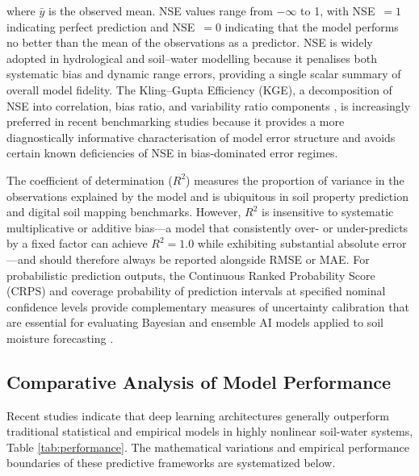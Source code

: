 \documentclass[land,article,submit,pdftex,moreauthors]{Definitions/mdpi}
\numberwithin{equation}{section}
\begin{document}
where $\bar{y}$ is the observed mean. NSE values range from $-\infty$ to 1, with NSE~$= 1$ indicating perfect prediction and NSE~$= 0$ indicating that the model performs no better than the mean of the observations as a predictor. NSE is widely adopted in hydrological and soil--water modelling because it penalises both systematic bias and dynamic range errors, providing a single scalar summary of overall model fidelity. The Kling--Gupta Efficiency (KGE), a decomposition of NSE into correlation, bias ratio, and variability ratio components \citep{gupta2009decomposition}, is increasingly preferred in recent benchmarking studies because it provides a more diagnostically informative characterisation of model error structure and avoids certain known deficiencies of NSE in bias-dominated error regimes.

The coefficient of determination ($R^2$) measures the proportion of variance in the observations explained by the model and is ubiquitous in soil property prediction and digital soil mapping benchmarks. However, $R^2$ is insensitive to systematic multiplicative or additive bias---a model that consistently over- or under-predicts by a fixed factor can achieve $R^2 = 1.0$ while exhibiting substantial absolute error---and should therefore always be reported alongside RMSE or MAE. For probabilistic prediction outputs, the Continuous Ranked Probability Score (CRPS) and coverage probability of prediction intervals at specified nominal confidence levels provide complementary measures of uncertainty calibration that are essential for evaluating Bayesian and ensemble AI models applied to soil moisture forecasting \citep{gneiting2007strictly}.

\subsection{Comparative Analysis of Model Performance}
Recent studies indicate that deep learning architectures generally outperform traditional statistical and empirical models in highly nonlinear soil-water systems, Table \ref{tab:performance}. The mathematical variations and empirical performance boundaries of these predictive frameworks are systematized below.

\footnotesize
\setlength{\LTleft}{0pt}
\setlength{\LTright}{0pt}
\end{document}
